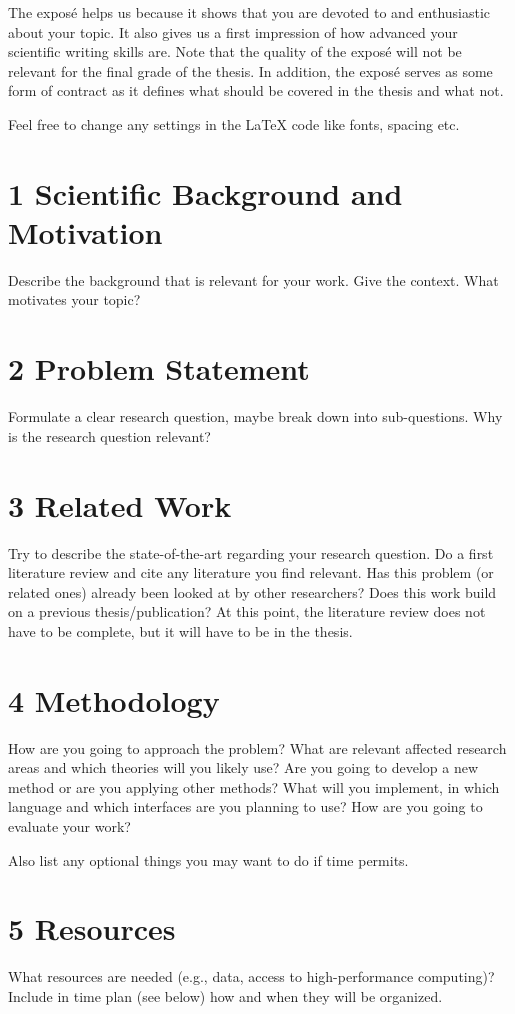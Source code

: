 \documentclass[a4paper,11pt]{article}
\begin{document}
The exposé helps us because it shows that you are devoted to and enthusiastic about your topic. It also gives us a first impression of how advanced your scientific writing skills are. Note that the quality of the exposé will not be relevant for the final grade of the thesis. In addition, the exposé serves as some form of contract as it defines what should be covered in the thesis and what not.

Feel free to change any settings in the LaTeX code like fonts, spacing etc.

\section*{1 Scientific Background and Motivation}
Describe the background that is relevant for your work. Give the context. What motivates your topic?

\section*{2 Problem Statement}
Formulate a clear research question, maybe break down into sub-questions. Why is the research question relevant?

\section*{3 Related Work}
Try to describe the state-of-the-art regarding your research question. Do a first literature review and cite any literature you find relevant. Has this problem (or related ones) already been looked at by other researchers? Does this work build on a previous thesis/publication? At this point, the literature review does not have to be complete, but it will have to be in the thesis.

\section*{4 Methodology}
How are you going to approach the problem? What are relevant affected research areas and which theories will you likely use? Are you going to develop a new method or are you applying other methods? What will you implement, in which language and which interfaces are you planning to use? How are you going to evaluate your work?

Also list any optional things you may want to do if time permits.

\clearpage

\section*{5 Resources}
What resources are needed (e.g., data, access to high-performance computing)? Include in time plan (see below) how and when they will be organized.
\end{document}

